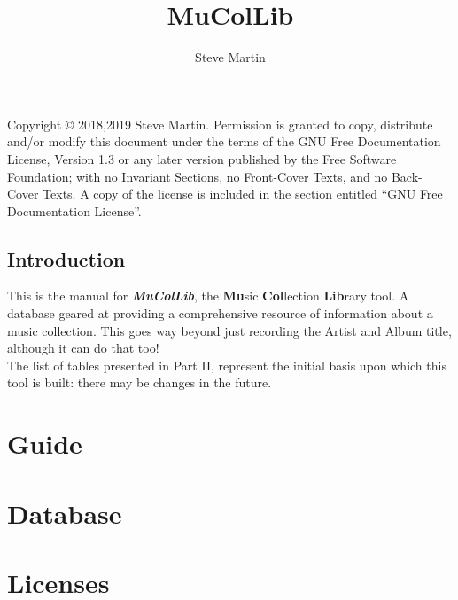 \documentclass[12pt,a4paper,final,twoside,titlepage]{book}
\author{\LARGE Steve Martin}
\title{\Huge MuColLib}
\begin{document}
\maketitle
\null
\vfill
Copyright \copyright{}  2018,2019  Steve Martin.
Permission is granted to copy, distribute and/or modify this document
under the terms of the GNU Free Documentation License, Version 1.3
or any later version published by the Free Software Foundation;
with no Invariant Sections, no Front-Cover Texts, and no Back-Cover Texts.
A copy of the license is included in the section entitled ``GNU
Free Documentation License''.
\frontmatter
\tableofcontents
\newpage
\chapter{Introduction}
This is the manual for \textbf{\textit{MuColLib}}, the \textbf{Mu}sic \textbf{Col}lection \textbf{Lib}rary tool. A database geared at providing a comprehensive resource of information about a music collection.  This goes way beyond just recording the Artist and Album title, although it can do that too!
\\

The list of tables presented in Part II, represent the initial basis upon which this tool is built: there may be changes in the future.
 
\mainmatter
\part{Guide}



\part{Database}

\part{Licenses}

\newpage

\end{document}
